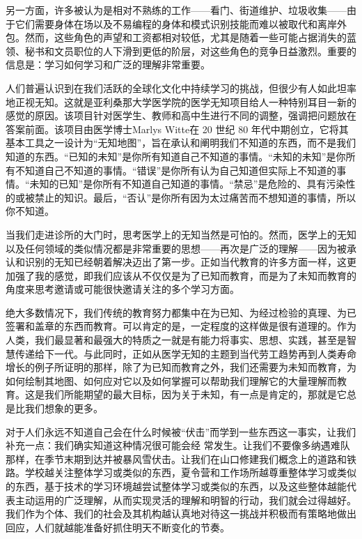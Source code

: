 另一方面，许多被认为是相对不熟练的工作——看门、街道维护、垃圾收集——由于它们需要身体在场以及不易编程的身体和模式识别技能而难以被取代和离岸外包。然而，这些角色的声望和工资都相对较低，尤其是随着一些可能占据消失的蓝领、秘书和文员职位的人下滑到更低的阶层，对这些角色的竞争日益激烈。重要的信息是：学习如何学习和广泛的理解非常重要。

人们普遍认识到在我们活跃的全球化文化中持续学习的挑战，但很少有人如此坦率地正视无知。这就是亚利桑那大学医学院的医学无知项目给人一种特别耳目一新的感觉的原因。该项目针对医学生、教师和高中生进行不同的调整，强调把问题放在答案前面。该项目由医学博士Marlys Witte在 20 世纪 80 年代中期创立，它将其基本工具之一设计为“无知地图”，旨在承认和阐明我们不知道的东西，而不是我们知道的东西。“已知的未知”是你所有知道自己不知道的事情。“未知的未知”是你所有不知道自己不知道的事情。“错误”是你所有认为自己知道但实际上不知道的事情。“未知的已知”是你所有不知道自己知道的事情。“禁忌”是危险的、具有污染性的或被禁止的知识。最后，“否认”是你所有因为太过痛苦而不想知道的事情，所以你不知道。

当我们走进诊所的大门时，思考医学上的无知当然是可怕的。然而，医学上的无知以及任何领域的类似情况都是非常重要的思想——再次是广泛的理解——因为被承认和识别的无知已经朝着解决迈出了第一步。正如当代教育的许多方面一样，这更加强了我的感觉，即我们应该从不仅仅是为了已知而教育，而是为了未知而教育的角度来思考邀请或可能很快邀请关注的多个学习方面。

绝大多数情况下，我们传统的教育努力都集中在为已知、为经过检验的真理、为已签署和盖章的东西而教育。可以肯定的是，一定程度的这样做是很有道理的。作为人类，我们最显著和最强大的特质之一就是有能力将事实、思想、实践，甚至是智慧传递给下一代。与此同时，正如从医学无知的主题到当代劳工趋势再到人类寿命增长的例子所证明的那样，除了为已知而教育之外，我们还需要为未知而教育，为如何绘制其地图、如何应对它以及如何掌握可以帮助我们理解它的大量理解而教育。这是我们所能期望的最大目标，因为关于未知，有一点是肯定的，那就是它总是比我们想象的更多。

对于人们永远不知道自己会在什么时候被“伏击”而学到一些东西这一事实，让我们补充一点：我们确实知道这种情况很可能会经
常发生。让我们不要像多纳遇难队那样，在季节末期到达并被暴风雪伏击。让我们在山口修建我们概念上的道路和铁路。学校越关注整体学习或类似的东西，夏令营和工作场所越尊重整体学习或类似的东西，基于技术的学习环境越尝试整体学习或类似的东西，以及这些整体越能代表主动运用的广泛理解，从而实现灵活的理解和明智的行动，我们就会过得越好。我们作为个体、我们的社会及其机构越认真地对待这一挑战并积极而有策略地做出回应，人们就越能准备好抓住明天不断变化的节奏。